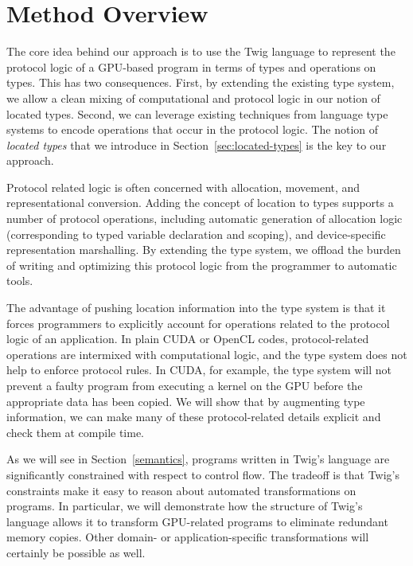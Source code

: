 
\section{Method Overview}

The core idea behind our approach is to use the Twig language to represent the protocol logic of a GPU-based program in terms of types and operations on types. This has two consequences. First, by extending the existing type system, we allow a clean mixing of computational and protocol logic in our notion of located types. Second, we can leverage existing techniques from language type systems to encode operations that occur in the protocol logic. The notion of \emph{located types} that we introduce in Section~\ref{sec:located-types} is the key to our approach.

Protocol related logic is often concerned with allocation, movement, and representational conversion. Adding the concept of location to types supports a number of protocol operations, including automatic generation of allocation logic (corresponding to typed variable declaration and scoping), and device-specific representation marshalling. By extending the type system, we offload the burden of writing and optimizing this protocol logic from the programmer to automatic tools.

The advantage of pushing location information into the type system is that it forces programmers to explicitly account for operations related to the protocol logic of an application. In plain CUDA or OpenCL codes, protocol-related operations are intermixed with computational logic, and the type system does not help to enforce protocol rules. In CUDA, for example, the type system will not prevent a faulty program from executing a kernel on the GPU before the appropriate data has been copied. We will show that by augmenting type information, we can make many of these protocol-related details explicit and check them at compile time.

As we will see in Section~\ref{semantics}, programs written in Twig's language are significantly constrained with respect to control flow. The tradeoff is that Twig's constraints make it easy to reason about automated transformations on programs. In particular, we will demonstrate how the structure of Twig's language allows it to transform GPU-related programs to eliminate redundant memory copies. Other domain- or application-specific transformations will certainly be possible as well.

